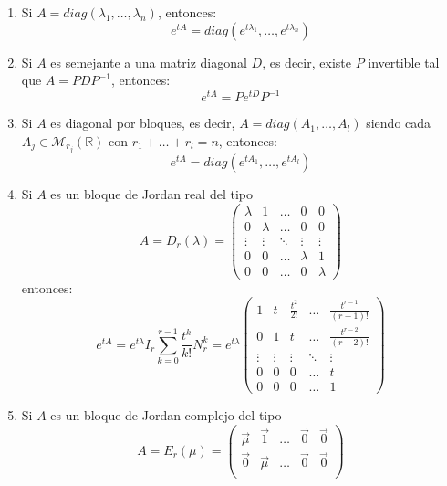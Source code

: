 \begin{enumerate}
    \item Si $A = diag(\lambda_1, \dots, \lambda_n)$, entonces:
          $$e^{tA} = diag(e^{t\lambda_1}, \dots, e^{t\lambda_n})$$
    \item Si $A$ es semejante a una matriz diagonal $D$, es decir, existe $P$ invertible tal que $A = PDP^{-1}$, entonces:
          $$e^{tA} = Pe^{tD}P^{-1}$$
    \item Si $A$ es diagonal por bloques, es decir, $A = diag(A_1, \dots, A_l)$ siendo cada $A_j \in \mathcal{M}_{r_j}(\mathbb{R})$ con $r_1 + \dots + r_l = n$, entonces:
          $$e^{tA} = diag(e^{tA_1}, \dots, e^{tA_l})$$
    \item Si $A$ es un bloque de Jordan real del tipo
          $$A = D_r(\lambda) = \begin{pmatrix}
                  \lambda & 1       & \dots  & 0       & 0       \\
                  0       & \lambda & \dots  & 0       & 0       \\
                  \vdots  & \vdots  & \ddots & \vdots  & \vdots  \\
                  0       & 0       & \dots  & \lambda & 1       \\
                  0       & 0       & \dots  & 0       & \lambda
              \end{pmatrix}$$
          entonces:
          $$e^{tA} = e^{t\lambda}I_r\sum_{k=0}^{r-1}{\frac{t^k}{k!}N_r^k} = e^{t\lambda}\begin{pmatrix}
                  1      & t      & \frac{t^2}{2!} & \dots  & \frac{t^{r-1}}{(r-1)!} \\
                  0      & 1      & t              & \dots  & \frac{t^{r-2}}{(r-2)!} \\
                  \vdots & \vdots & \vdots         & \ddots & \vdots                 \\
                  0      & 0      & 0              & \dots  & t                      \\
                  0      & 0      & 0              & \dots  & 1
              \end{pmatrix}$$
    \item Si $A$ es un bloque de Jordan complejo del tipo
          $$A = E_r(\mu) = \begin{pmatrix}
                  \vec{\mu} & \vec{1}   & \dots  & \vec{0}   & \vec{0}   \\
                  \vec{0}   & \vec{\mu} & \dots  & \vec{0}   & \vec{0}   \\

\end{pmatrix}$$
\end{enumerate}
